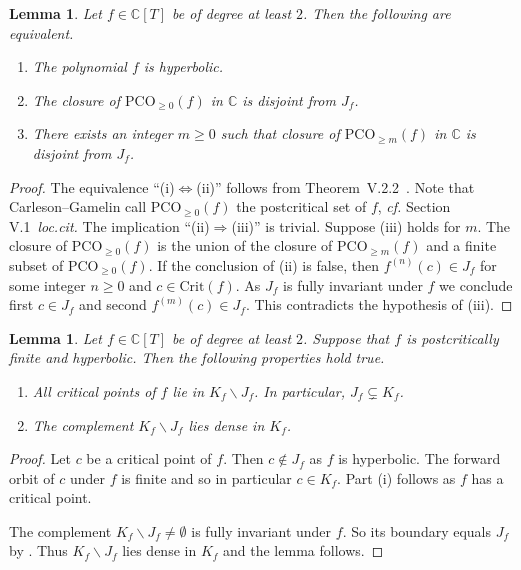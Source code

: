 \documentclass[12pt,oneside,a4]{amsart}
\newcommand{\IC}{\mathbb{C}}
\newcounter{maincounter}
\numberwithin{maincounter}{section}
\numberwithin{equation}{section}
\newtheorem{lemma}[maincounter]{Lemma}
\newcommand{\ssm}{\smallsetminus}
\newcommand{\crit}[1]{\mathrm{Crit}({#1})}
\newcommand{\pco}{\mathrm{PCO}}
\begin{document}
\begin{lemma}
  \label{lem:hyperboliccharacterization}
  Let $f\in\IC[T]$ be of degree at least $2$.  Then the following are
  equivalent.
  \begin{enumerate}
  \item [(i)] The polynomial $f$ is hyperbolic.
  \item[(ii)] The closure of $\pco_{\ge 0}(f)$ in $\IC$ is disjoint from $J_f$.
  \item[(iii)] There exists an integer $m\ge 0$ such that
    closure of $\pco_{\ge m}(f)$ in $\IC$ is disjoint from $J_f$.
  \end{enumerate}
\end{lemma}
\begin{proof}
  The equivalence ``(i)$\Leftrightarrow$(ii)'' follows from
  Theorem~V.2.2~\cite{CarlesonGamelin}. Note that
  Carleson--Gamelin call $\pco_{\ge 0}(f)$ the postcritical set
  of $f$, \textit{cf.} Section V.1~\textit{loc.cit.}
  The implication
  ``(ii)$\Rightarrow$(iii)'' is trivial. Suppose (iii) holds for $m$.
  The closure of $\pco_{\ge 0}(f)$ is the union of the closure of
  $\pco_{\ge m}(f)$ and a finite subset of $\pco_{\ge 0}(f)$.    
  If the conclusion of (ii) is false, then $f^{(n)}(c)\in J_f$ for
  some integer $n\ge 0$ and $c\in \crit{f}$. As $J_f$ is fully
  invariant under $f$ we conclude first $c\in J_f$ and second $f^{(m)}(c)\in
  J_f$. This contradicts the hypothesis of (iii). 
\end{proof}

\begin{lemma}
  \label{lem:KfJfdenseinKf}
  Let $f\in\IC[T]$ be of degree at least $2$. Suppose that $f$ is
  postcritically finite and hyperbolic. Then the following properties hold true.
  \begin{enumerate}
  \item[(i)]  
    All critical points of $f$ lie in $K_f\ssm J_f$.
    In particular,   $J_f\subsetneq K_f$.
  \item [(ii)]
    The complement $K_f\ssm J_f$ lies dense in $K_f$.  
   \end{enumerate}
\end{lemma}
\begin{proof}
  Let $c$ be a critical point of $f$. Then $c\not\in
  J_f$ as $f$ is hyperbolic. The forward orbit of $c$ 
  under $f$ is finite and so in particular 
  $c\in K_f$. Part (i) follows as $f$ has a critical point.
  
  The complement $K_f\ssm J_f\not=\emptyset$ is
  fully invariant under $f$.
  So its boundary equals $J_f$ by  \cite[Theorem III.1.7]{CarlesonGamelin}.
  Thus $K_f\ssm J_f$ lies dense in $K_f$ and the lemma follows.
\end{proof}
\end{document}
